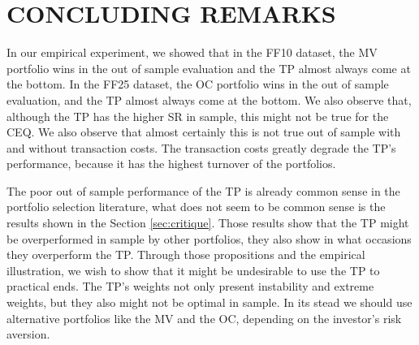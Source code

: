 \documentclass[12pt,oneside,a4paper]{memoir}
\begin{document}
\section{CONCLUDING REMARKS} \label{sec:conclusion}

In our empirical experiment, we showed that in the FF10 dataset, the MV portfolio wins in the out of sample evaluation and the TP almost always come at the bottom. In the FF25 dataset, the OC portfolio wins in the out of sample evaluation, and the TP almost always come at the bottom. We also observe that, although the TP has the higher SR in sample, this might not be true for the CEQ. We also observe that almost certainly this is not true out of sample with and without transaction costs. The transaction costs greatly degrade the TP's performance, because it has the highest turnover of the portfolios.

The poor out of sample performance of the TP is already common sense in the portfolio selection literature, what does not seem to be common sense is the results shown in the Section \ref{sec:critique}. Those results show that the TP might be overperformed in sample by other portfolios, they also show in what occasions they overperform the TP. Through those propositions and the empirical illustration, we wish to show that it might be undesirable to use the TP to practical ends. The TP's weights not only present instability and extreme weights, but they also might not be optimal in sample. In its stead we should use alternative portfolios like the MV and the OC, depending on the investor's risk aversion.








\begin{landscape}



\end{landscape}
\end{document}
